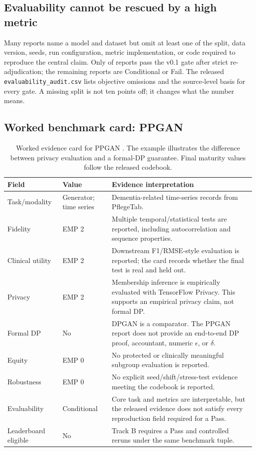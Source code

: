\documentclass[11pt,letterpaper]{article}
\begin{document}
\subsection{Evaluability cannot be rescued by a high metric}

Many reports name a model and dataset but omit at least one of the split, data version, seeds, run configuration, metric implementation, or code required to reproduce the central claim. Only \PassN{} of \CorpusN{} reports pass the v0.1 gate after strict re-adjudication; the remaining reports are Conditional or Fail. The released \texttt{evaluability\_audit.csv} lists objective omissions and the source-level basis for every gate. A missing split is not ten points off; it changes what the number means.

\subsection{Worked benchmark card: PPGAN}

\begin{table}[t]
\centering
\caption{Worked evidence card for PPGAN \citep{ashrafi2023ppgan}. The example illustrates the difference between privacy evaluation and a formal-DP guarantee. Final maturity values follow the released codebook.}
\label{tab:card}
\small
\begin{tabularx}{\textwidth}{P{2.6cm}P{2.0cm}Y}
\toprule
Field & Value & Evidence interpretation \\
\midrule
Task/modality & Generator; time series & Dementia-related time-series records from PflegeTab. \\
Fidelity & EMP 2 & Multiple temporal/statistical tests are reported, including autocorrelation and sequence properties. \\
Clinical utility & EMP 2 & Downstream F1/RMSE-style evaluation is reported; the card records whether the final test is real and held out. \\
Privacy & EMP 2 & Membership inference is empirically evaluated with TensorFlow Privacy. This supports an empirical privacy claim, not formal DP. \\
Formal DP & No & DPGAN is a comparator. The PPGAN report does not provide an end-to-end DP proof, accountant, numeric $\epsilon$, or $\delta$. \\
Equity & EMP 0 & No protected or clinically meaningful subgroup evaluation is reported. \\
Robustness & EMP 0 & No explicit seed/shift/stress-test evidence meeting the codebook is reported. \\
Evaluability & Conditional & Core task and metrics are interpretable, but the released evidence does not satisfy every reproduction field required for a Pass. \\
Leaderboard eligible & No & Track B requires a Pass and controlled reruns under the same benchmark tuple. \\
\bottomrule
\end{tabularx}
\end{table}
\end{document}
